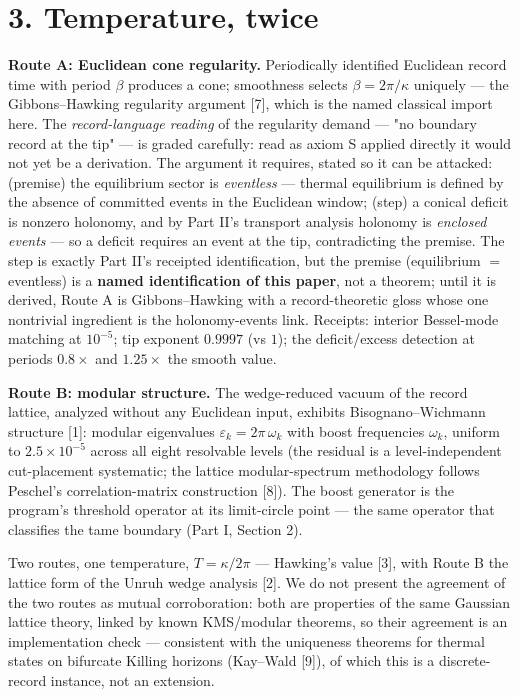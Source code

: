 \documentclass[11pt]{article}
\begin{document}
\section*{3. Temperature, twice}
\textbf{Route A: Euclidean cone regularity.}  Periodically identified Euclidean record time with period $\beta$ produces a cone; smoothness selects $\beta = 2\pi/\kappa$ uniquely — the Gibbons–Hawking regularity argument [7], which is the named classical import here.  The \emph{record-language reading} of the regularity demand — "no boundary record at the tip" — is graded carefully: read as axiom S applied directly it would not yet be a derivation.  The argument it requires, stated so it can be attacked: (premise) the equilibrium sector is \emph{eventless} — thermal equilibrium is defined by the absence of committed events in the Euclidean window; (step) a conical deficit is nonzero holonomy, and by Part II's transport analysis holonomy is \emph{enclosed events} — so a deficit requires an event at the tip, contradicting the premise.  The step is exactly Part II's receipted identification, but the premise (equilibrium $=$ eventless) is a \textbf{named identification of this paper}, not a theorem; until it is derived, Route A is Gibbons–Hawking with a record-theoretic gloss whose one nontrivial ingredient is the holonomy-events link.  Receipts: interior Bessel-mode matching at $10^{-5}$; tip exponent $0.9997$ (vs $1$); the deficit/excess detection at periods $0.8\times$ and $1.25\times$ the smooth value.

\textbf{Route B: modular structure.}  The wedge-reduced vacuum of the record lattice, analyzed without any Euclidean input, exhibits Bisognano–Wichmann structure [1]: modular eigenvalues $\varepsilon_k = 2\pi\,\omega_k$ with boost frequencies $\omega_k$, uniform to $2.5\times 10^{-5}$ across all eight resolvable levels (the residual is a level-independent cut-placement systematic; the lattice modular-spectrum methodology follows Peschel's correlation-matrix construction [8]).  The boost generator is the program's threshold operator at its limit-circle point — the same operator that classifies the tame boundary (Part I, Section 2).

Two routes, one temperature, $T = \kappa/2\pi$ — Hawking's value [3], with Route B the lattice form of the Unruh wedge analysis [2].  We do not present the agreement of the two routes as mutual corroboration: both are properties of the same Gaussian lattice theory, linked by known KMS/modular theorems, so their agreement is an implementation check — consistent with the uniqueness theorems for thermal states on bifurcate Killing horizons (Kay–Wald [9]), of which this is a discrete-record instance, not an extension.
\end{document}
